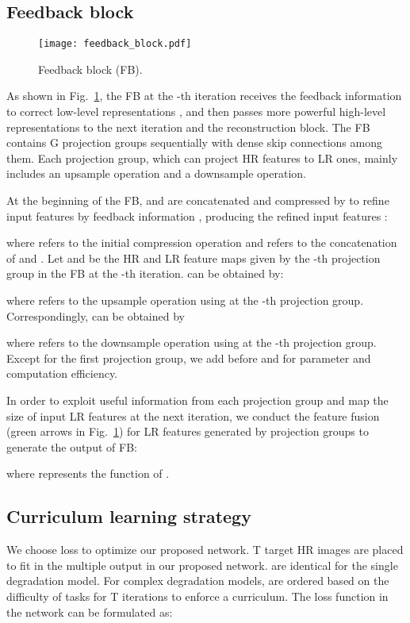 \documentclass[10pt,twocolumn,letterpaper]{article}
\begin{document}
	\subsection{Feedback block}
	\label{Sec3.2}
	
	\begin{figure}[h]
		\centering
		\texttt{[image: feedback\_block.pdf]}
		\caption{Feedback block (FB).}
		\label{FB}
	\end{figure}
	
    As shown in Fig.~\ref{FB}, the FB at the -th iteration receives the feedback information  to correct low-level representations , and then passes more powerful high-level representations  to the next iteration and the reconstruction block. The FB contains G projection groups sequentially with dense skip connections among them. Each projection group, which can project HR features to LR ones, mainly includes an upsample operation and a downsample operation.
	
	At the beginning of the FB,  and  are concatenated and compressed by  to refine input features  by feedback information , producing the refined input features :
	
	where  refers to the initial compression operation and  refers to the concatenation of  and . Let  and  be the HR and LR feature maps given by the -th projection group in the FB at the -th iteration.  can be obtained by:
	
	where  refers to the upsample operation using  at the -th projection group. Correspondingly,  can be obtained by
	
	where  refers to the downsample operation using  at the -th projection group.
	Except for the first projection group, we add  before  and  for parameter and computation efficiency.
	
	In order to exploit useful information from each projection group and map the size of input LR features  at the next iteration, we conduct the feature fusion (green arrows in Fig.~\ref{FB}) for LR features generated by projection groups to generate the output of FB:
	
	where  represents the function of .
	
	\subsection{Curriculum learning strategy}
	\label{3.3}
	We choose  loss to optimize our proposed network. T target HR images  are placed to fit in the multiple output in our proposed network.  are identical for the single degradation model. For complex degradation models,  are ordered based on the difficulty of tasks for T iterations to enforce a curriculum. The loss function in the network can be formulated as:
	
\end{document}
